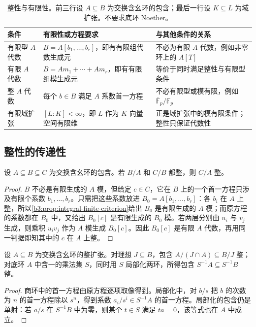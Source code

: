 \begin{table}[htbp]
	\centering
	\caption[整性与有限性]{整性与有限性。前三行设 \(A\subseteq B\) 为交换含幺环的包含；最后一行设 \(K\subseteq L\) 为域扩张。不要求底环 Noether。}
	\label{b3:tab:integrality-finiteness}
	\begin{tabularx}{\textwidth}{@{}>{\raggedright\arraybackslash}p{}>{\raggedright\arraybackslash}X>{\raggedright\arraybackslash}p{}@{}}
		\toprule
		条件 & 有限性或方程要求 & 与其他条件的关系 \\
		\midrule
		有限型 \(A\) 代数 & \(B=A[b_1,\ldots,b_r]\)，即有有限组代数生成元 & 不必为有限 \(A\) 代数，例如非零环上的 \(A[T]\) \\
		有限 \(A\) 代数 & \(B=Am_1+\cdots+Am_r\)，即有有限组模生成元 & 等价于同时满足整性与有限型条件 \\
		整 \(A\) 代数 & 每个 \(b\in B\) 满足 \(A\) 系数首一方程 & 不必有限型或模有限，例如 \(\overline{\mathbb F}_p/\mathbb F_p\) \\
		有限域扩张 & \([L:K]<\infty\)，即 \(L\) 作为 \(K\) 向量空间有限维 & 正是域扩张中的模有限条件；整性只保证代数性 \\
		\bottomrule
	\end{tabularx}
\end{table}

\subsection{整性的传递性}\label{b3:subsec:0501:02}

\begin{proposition}[整性的传递性]\label{b3:prop:integral-transitivity}
	设 \(A\subseteq B\subseteq C\) 为交换含幺环的包含。若 \(B/A\) 和 \(C/B\) 都整，则 \(C/A\) 整。
\end{proposition}
\begin{proof}
	\(B\) 不必是有限生成的 \(A\) 模，但给定 \(c\in C\)，它在 \(B\) 上的一个首一方程只涉及有限个系数 \(b_1,\ldots,b_r\)。只需把这些系数放进 \(B_0=A[b_1,\ldots,b_r]\)：各 \(b_i\) 在 \(A\) 上整，所以\cref{b3:prop:integral-finite-criterion}给出 \(B_0\) 是有限生成的 \(A\) 模；而原方程的系数都在 \(B_0\) 中，又给出 \(B_0[c]\) 是有限生成的 \(B_0\) 模。若两层分别由 \(u_i\) 与 \(v_j\) 生成，则乘积 \(u_iv_j\) 作为 \(A\) 模生成 \(B_0[c]\)。因此 \(B_0[c]\) 是有限 \(A\) 代数，再用同一判据即知其中的 \(c\) 在 \(A\) 上整。
\end{proof}

\begin{proposition}\label{b3:prop:integral-quotient-localization}
	设 \(A\subseteq B\) 为交换含幺环的整扩张。对理想 \(J\subseteq B\)，包含 \(A/(J\cap A)\subseteq B/J\) 整；对底环 \(A\) 中含一的乘法集 \(S\)，同时用 \(S\) 局部化两环，所得包含 \(S^{-1}A\subseteq S^{-1}B\) 整。
\end{proposition}
\begin{proof}
	商环中的首一方程由原方程逐项取像得到。局部化中，对 \(b/s\) 把 \(b\) 的次数为 \(n\) 的首一方程除以 \(s^n\)，得到系数 \(a_i/s^i\in S^{-1}A\) 的首一方程。局部化的包含仍是单射：若 \(a/s\) 在 \(S^{-1}B\) 中为零，则某个 \(t\in S\) 满足 \(ta=0\)，该等式也在 \(A\) 中成立。
\end{proof}

